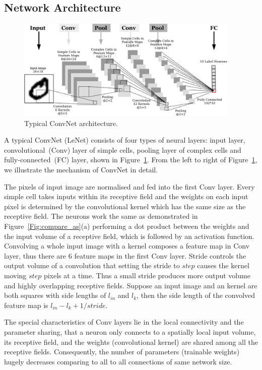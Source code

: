 \subsection{Network Architecture}

	\begin{figure}[bt]
		\centering
		\includegraphics[width=0.95\textwidth]{pics_snn/convnet.pdf}
		\caption{Typical ConvNet architecture.}
		\label{Fig:ConvNet}
	\end{figure}

A typical ConvNet (LeNet) consists of four types of neural layers: input layer, convolutional~(Conv) layer of simple cells, pooling layer of complex cells and fully-connected~(FC) layer, shown in Figure~\ref{Fig:ConvNet}.
From the left to right of Figure~\ref{Fig:ConvNet}, we illustrate the mechanism of ConvNet in detail.

The pixels of input image are normalised and fed into the first Conv layer.
Every simple cell takes inputs within its receptive field and the weights on each input pixel is determined by the convolutional kernel which has the same size as the receptive field.
The neurons work the same as demonstrated in Figure~\ref{Fig:compare_as}(a) performing a dot product between the weights and the input volume of a receptive field, which is followed by an activation function.
Convolving a whole input image with a kernel composes a feature map in Conv layer, thus there are 6 feature maps in the first Conv layer.
Stride controls the output volume of a convolution that setting the stride to $step$ causes the kernel moving $step$ pixels at a time.
Thus a small stride produces more output volume and highly overlapping receptive fields.
Suppose an input image and an kernel are both squares with side lengths of $l_{in}$ and $l_k$, then the side length of the convolved feature map is $l_{in} - l_k + 1/stride$.

The special characteristics of Conv layers lie in the local connectivity and the parameter sharing, that a neuron only connects to a spatially local input volume, its receptive field, and the weights (convolutional kernel) are shared among all the receptive fields.
Consequently, the number of parameters (trainable weights) hugely decreases comparing to all to all connections of same network size. 

